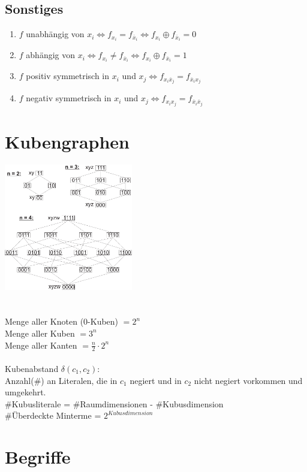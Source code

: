 \documentclass[a4paper,twocolumn,10pt]{article}
\begin{document}
\subsection*{Sonstiges}
\begin{enumerate}[label=-]
	\item $f$ unabhängig von $x_i \Leftrightarrow f_{x_i}=f_{\overline{x}_i}\Leftrightarrow f_{x_i}\oplus f_{\overline{x}_i}=0$
	\item $f$ abhängig von $x_i \Leftrightarrow f_{x_i}\neq f_{\overline{x}_i}\Leftrightarrow f_{x_i}\oplus f_{\overline{x}_i}=1$
	\item $f$ positiv symmetrisch in $x_i$ und $x_j \Leftrightarrow f_{x_i\overline{x}_j}=f_{\overline{x}_ix_j}$
	\item $f$ negativ symmetrisch in $x_i$ und $x_j \Leftrightarrow f_{x_ix_j}=f_{\overline{x}_i\overline{x}_j}$
\end{enumerate}

\section*{Kubengraphen}
\includegraphics[width=0.42\textwidth]{Grafiken/Kubengraphen}\\\\\\
Menge aller Knoten (0-Kuben) $=2^n$\\
Menge aller Kuben $=3^n$\\
Menge aller Kanten $=\frac{n}{2}\cdot 2^n$\\\\
Kubenabstand $\delta(c_1,c_2)$:\\
Anzahl($\#$) an Literalen, die in $c_1$ negiert und in $c_2$ nicht negiert vorkommen und umgekehrt.\\
$\#$Kubusliterale = $\#$Raumdimensionen - $\#$Kubusdimension\\
$\#$Überdeckte Minterme = $2^{Kubusdimension}$

\section*{Begriffe}
\end{document}
